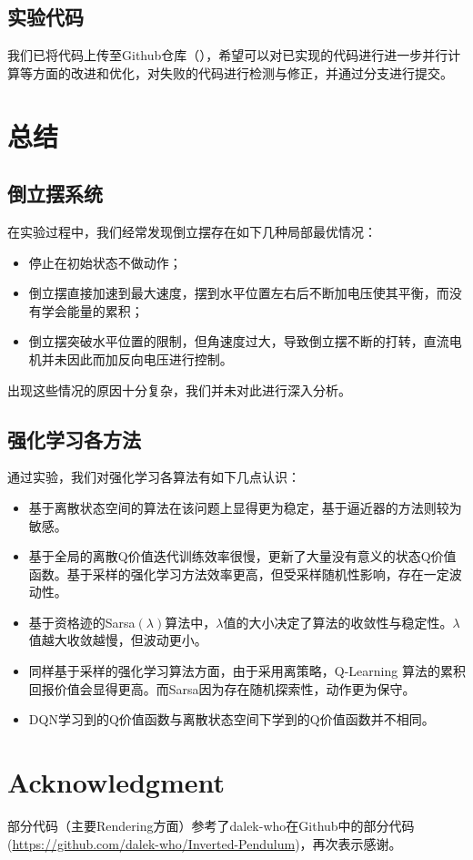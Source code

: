 \documentclass[conference,10pt]{IEEEtran}
\begin{document}
\subsection{实验代码}
我们已将代码上传至Github仓库（），希望可以对已实现的代码进行进一步并行计算等方面的改进和优化，对失败的代码进行检测与修正，并通过分支进行提交。


\section{总结}
\subsection{倒立摆系统}
在实验过程中，我们经常发现倒立摆存在如下几种局部最优情况：
\begin{itemize}
\item 停止在初始状态不做动作；
\item 倒立摆直接加速到最大速度，摆到水平位置左右后不断加电压使其平衡，而没有学会能量的累积；
\item 倒立摆突破水平位置的限制，但角速度过大，导致倒立摆不断的打转，直流电机并未因此而加反向电压进行控制。
\end{itemize}
出现这些情况的原因十分复杂，我们并未对此进行深入分析。
\subsection{强化学习各方法}
通过实验，我们对强化学习各算法有如下几点认识：
\begin{itemize}
\item 基于离散状态空间的算法在该问题上显得更为稳定，基于逼近器的方法则较为敏感。
\item 基于全局的离散Q价值迭代训练效率很慢，更新了大量没有意义的状态Q价值函数。基于采样的强化学习方法效率更高，但受采样随机性影响，存在一定波动性。
\item 基于资格迹的Sarsa$(\lambda)$算法中，$\lambda$值的大小决定了算法的收敛性与稳定性。$\lambda$ 值越大收敛越慢，但波动更小。
\item 同样基于采样的强化学习算法方面，由于采用离策略，Q-Learning 算法的累积回报价值会显得更高。而Sarsa因为存在随机探索性，动作更为保守。
\item DQN学习到的Q价值函数与离散状态空间下学到的Q价值函数并不相同。
\end{itemize}
\section*{Acknowledgment}
部分代码（主要Rendering方面）参考了dalek-who在Github中的部分代码(\href{https://github.com/dalek-who/Inverted-Pendulum}{https://github.com/dalek-who/Inverted-Pendulum})，再次表示感谢。
\end{document}
